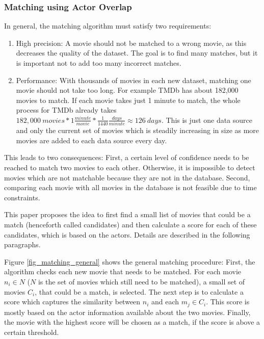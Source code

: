 \subsubsection{Matching using Actor Overlap}
In general, the matching algorithm must satisfy two requirements:
\begin{enumerate}
	\item{High precision:} A movie should not be matched to a wrong movie, as this decreases the quality of the dataset.
	The goal is to find many matches, but it is important not to add too many incorrect matches.
	\item{Performance:} With thousands of movies in each new dataset, matching one movie should not take too long.
	For example TMDb has about 182,000 movies to match.
	If each movie takes just 1 minute to match, the whole process for TMDb already takes $182,000~movies * 1 \frac{minute}{movie} * \frac{1}{1440} \frac{days}{minute} \approx 126~days$.
	This is just one data source and only the current set of movies which is steadily increasing in size as more movies are added to each data source every day.
\end{enumerate}

This leads to two consequences: First, a certain level of confidence needs to be reached to match two movies to each other.
Otherwise, it is impossible to detect movies which are not matchable because they are not in the database.
Second, comparing each movie with all movies in the database is not feasible due to time constraints.

This paper proposes the idea to first find a small list of movies that could be a match (henceforth called candidates) and then calculate a score for each of these candidates, which is based on the actors.
Details are described in the following paragraphs.

Figure \ref{fig_matching_general} shows the general matching procedure:
First, the algorithm checks each new movie that needs to be matched.
For each movie $n_i \in N$ ($N$ is the set of movies which still need to be matched), a small set of movies $C_{i}$, that could be a match, is selected.
The next step is to calculate a score which captures the similarity between $n_i$ and each $m_j \in C_i$.
This score is mostly based on the actor information available about the two movies.
Finally, the movie with the highest score will be chosen as a match, if the score is above a certain threshold.

